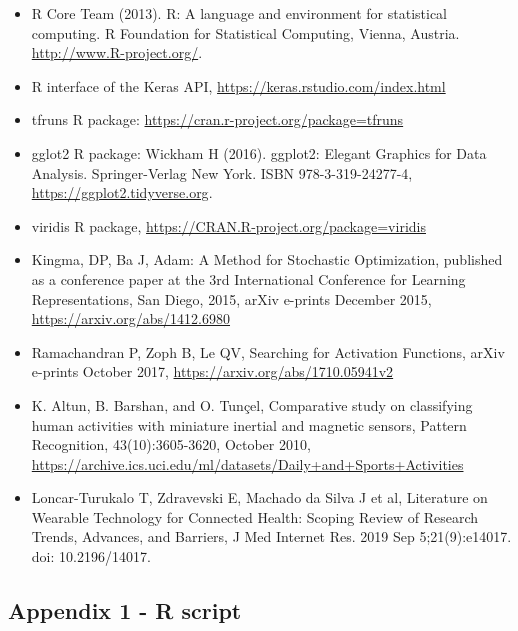 \documentclass[]{article}
\begin{document}
\begin{itemize}
\item
  R Core Team (2013). R: A language and environment for statistical
  computing. R Foundation for Statistical Computing, Vienna, Austria.
  \url{http://www.R-project.org/}.
\item
  R interface of the Keras API,
  \url{https://keras.rstudio.com/index.html}
\item
  tfruns R package: \url{https://cran.r-project.org/package=tfruns}
\item
  gglot2 R package: Wickham H (2016). ggplot2: Elegant Graphics for Data
  Analysis. Springer-Verlag New York. ISBN 978-3-319-24277-4,
  \url{https://ggplot2.tidyverse.org}.
\item
  viridis R package, \url{https://CRAN.R-project.org/package=viridis}
\item
  Kingma, DP, Ba J, Adam: A Method for Stochastic Optimization,
  published as a conference paper at the 3rd International Conference
  for Learning Representations, San Diego, 2015, arXiv e-prints December
  2015, \url{https://arxiv.org/abs/1412.6980}
\item
  Ramachandran P, Zoph B, Le QV, Searching for Activation Functions,
  arXiv e-prints October 2017, \url{https://arxiv.org/abs/1710.05941v2}
\item
  K. Altun, B. Barshan, and O. Tunçel, Comparative study on classifying
  human activities with miniature inertial and magnetic sensors, Pattern
  Recognition, 43(10):3605-3620, October 2010,
  \url{https://archive.ics.uci.edu/ml/datasets/Daily+and+Sports+Activities}
\item
  Loncar-Turukalo T, Zdravevski E, Machado da Silva J et al, Literature
  on Wearable Technology for Connected Health: Scoping Review of
  Research Trends, Advances, and Barriers, J Med Internet Res. 2019 Sep
  5;21(9):e14017. doi: 10.2196/14017.
\end{itemize}

\hypertarget{appendix-1---r-script}{%
\subsection{Appendix 1 - R script}\label{appendix-1---r-script}}
\end{document}
